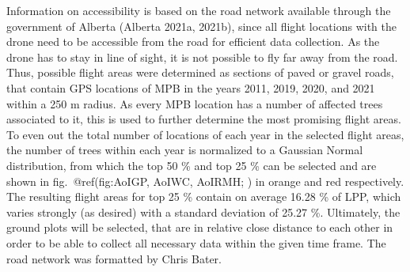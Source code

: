 \documentclass[
]{article}
\begin{document}
Information on accessibility is based on the road network available through the government of Alberta (Alberta 2021a, 2021b), since all flight locations with the drone need to be accessible from the road for efficient data collection. As the drone has to stay in line of sight, it is not possible to fly far away from the road. Thus, possible flight areas were determined as sections of paved or gravel roads, that contain GPS locations of MPB in the years 2011, 2019, 2020, and 2021 within a 250 m radius.
As every MPB location has a number of affected trees associated to it, this is used to further determine the most promising flight areas. To even out the total number of locations of each year in the selected flight areas, the number of trees within each year is normalized to a Gaussian Normal distribution, from which the top 50 \% and top 25 \% can be selected and are shown in fig.~@ref(fig:AoIGP, AoIWC, AoIRMH; ) in orange and red respectively. The resulting flight areas for top 25 \% contain on average 16.28 \% of LPP, which varies strongly (as desired) with a standard deviation of 25.27 \%. Ultimately, the ground plots will be selected, that are in relative close distance to each other in order to be able to collect all necessary data within the given time frame. The road network was formatted by Chris Bater.
\end{document}
